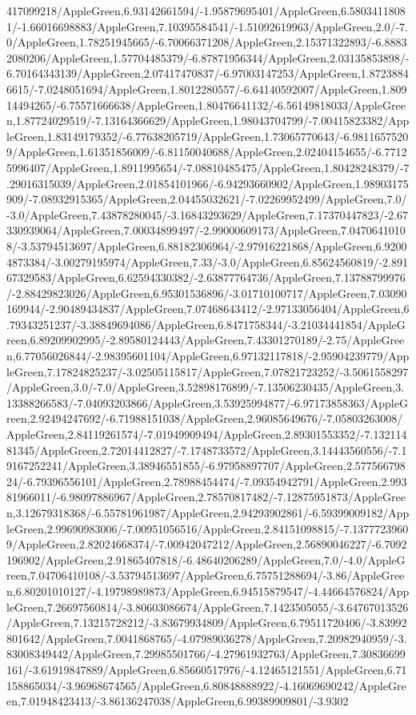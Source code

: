 {\begin{tikzternal}
417099218/AppleGreen,6.93142661594/-1.95879695401/AppleGreen,6.58034118081/-1.66016698883/AppleGreen,7.10395584541/-1.51092619963/AppleGreen,2.0/-7.0/AppleGreen,1.78251945665/-6.70066371208/AppleGreen,2.15371322893/-6.88832080206/AppleGreen,1.57704485379/-6.87871956344/AppleGreen,2.03135853898/-6.70164343139/AppleGreen,2.07417470837/-6.97003147253/AppleGreen,1.87238846615/-7.0248051694/AppleGreen,1.8012280557/-6.64140592007/AppleGreen,1.80914494265/-6.75571666638/AppleGreen,1.80476641132/-6.56149818033/AppleGreen,1.87724029519/-7.13164366629/AppleGreen,1.98043704799/-7.00415823382/AppleGreen,1.83149179352/-6.77638205719/AppleGreen,1.73065770643/-6.98116575209/AppleGreen,1.61351856009/-6.81150040688/AppleGreen,2.02404154655/-6.77125996407/AppleGreen,1.8911995654/-7.08810485475/AppleGreen,1.80428248379/-7.29016315039/AppleGreen,2.01854101966/-6.94293660902/AppleGreen,1.98903175909/-7.08932915365/AppleGreen,2.04455032621/-7.02269952499/AppleGreen,7.0/-3.0/AppleGreen,7.43878280045/-3.16843293629/AppleGreen,7.17370447823/-2.67330939064/AppleGreen,7.00034899497/-2.99000609173/AppleGreen,7.04706410108/-3.53794513697/AppleGreen,6.88182306964/-2.97916221868/AppleGreen,6.92004873384/-3.00279195974/AppleGreen,7.33/-3.0/AppleGreen,6.85624560819/-2.89167329583/AppleGreen,6.62594330382/-2.63877764736/AppleGreen,7.13788799976/-2.88429823026/AppleGreen,6.95301536896/-3.01710100717/AppleGreen,7.03090169944/-2.90489434837/AppleGreen,7.07468643412/-2.97133056404/AppleGreen,6.79343251237/-3.38849694086/AppleGreen,6.8471758344/-3.21034441854/AppleGreen,6.89209902995/-2.89580124443/AppleGreen,7.43301270189/-2.75/AppleGreen,6.77056026844/-2.98395601104/AppleGreen,6.97132117818/-2.95904239779/AppleGreen,7.17824825237/-3.02505115817/AppleGreen,7.07821723252/-3.5061558297/AppleGreen,3.0/-7.0/AppleGreen,3.52898176899/-7.13506230435/AppleGreen,3.13388266583/-7.04093203866/AppleGreen,3.53925994877/-6.97173858363/AppleGreen,2.92494247692/-6.71988151038/AppleGreen,2.96085649676/-7.05803263008/AppleGreen,2.84119261574/-7.01949909494/AppleGreen,2.89301553352/-7.13211481345/AppleGreen,2.72014412827/-7.1748733572/AppleGreen,3.14443560556/-7.19167252241/AppleGreen,3.38946551855/-6.97958897707/AppleGreen,2.57756679824/-6.79396556101/AppleGreen,2.78988454474/-7.09354942791/AppleGreen,2.99381966011/-6.98097886967/AppleGreen,2.78570817482/-7.12875951873/AppleGreen,3.12679318368/-6.55781961987/AppleGreen,2.94293902861/-6.59399009182/AppleGreen,2.99690983006/-7.00951056516/AppleGreen,2.84151098815/-7.13777239609/AppleGreen,2.82024668374/-7.00942047212/AppleGreen,2.56890046227/-6.7092196902/AppleGreen,2.91865407818/-6.48640206289/AppleGreen,7.0/-4.0/AppleGreen,7.04706410108/-3.53794513697/AppleGreen,6.75751288694/-3.86/AppleGreen,6.80201010127/-4.19798989873/AppleGreen,6.94515879547/-4.44664576824/AppleGreen,7.26697560814/-3.80603086674/AppleGreen,7.1423505055/-3.64767013526/AppleGreen,7.13215728212/-3.83679934809/AppleGreen,6.79511720406/-3.83992801642/AppleGreen,7.0041868765/-4.07989036278/AppleGreen,7.20982940959/-3.83008349442/AppleGreen,7.29985501766/-4.27961932763/AppleGreen,7.30836699161/-3.61919847889/AppleGreen,6.85660517976/-4.12465121551/AppleGreen,6.71158865034/-3.96968674565/AppleGreen,6.80848888922/-4.16069690242/AppleGreen,7.01948423413/-3.86136247038/AppleGreen,6.99389909801/-3.9302
\end{tikzternal}}
